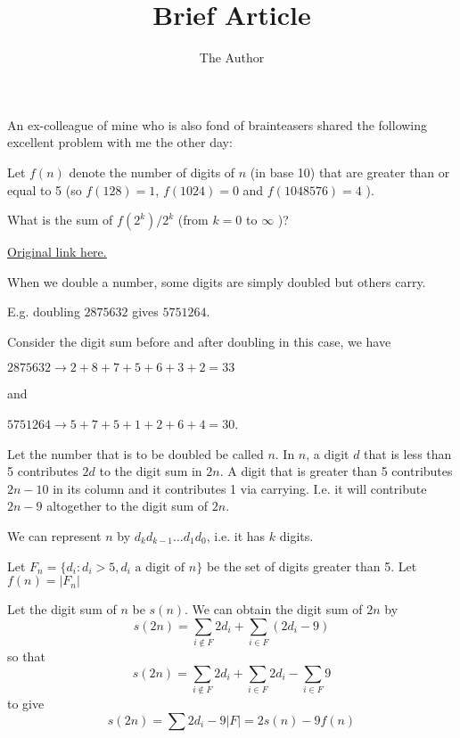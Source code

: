 \documentclass[11pt]{amsart}
\title{Brief Article}
\author{The Author}
\begin{document}
\maketitle



An ex-colleague of mine who is also fond of brainteasers shared the following excellent problem with me the other day:

Let  $f(n)$  denote the number of digits of  $n$  (in base 10) that are greater than or equal to 5 (so  $f(128)=1$, $f(1024)=0$ and  $f(1048576)=4$ ).

What is the sum of  $f(2^{k})/2^{k}$  (from  $k=0$  to $\infty$ )?

\vspace{2em}

\href{http://fine-disregard.blogspot.co.uk/2017/10/digits-in-powers-of-2.html}{Original link here.}

\vspace{2em}


When we double a number, some digits are simply doubled but others carry.

E.g. doubling $2875632$ gives $5751264$. 

Consider the digit sum before and after doubling in this case, we have 

$2875632 \rightarrow 2+8+7+5+6+3+2 = 33$ 

and 

$5751264 \rightarrow 5+7+5+1+2+6+4 = 30$.

Let the number that is to be doubled be called $n$. In $n$, a  digit $d$ that is less than 5 contributes $2d$ to the digit sum in $2n$. A digit that is greater than 5 contributes $2n - 10$ in its column and it contributes 1 via carrying. I.e. it will contribute $2n-9$ altogether to the digit sum of $2n$.

We can represent $n$ by $d_k d_{k-1} \ldots d_{1} d_{0}$, i.e. it has $k$ digits.

Let $F_{n} = \{d_{i} : d_{i} > 5 , d_{i}  \textrm{ a digit of } n\}$ be the set of digits greater than 5. Let  $f(n) = |F_{n}|$

Let the digit sum of $n$ be $s(n)$.  We can obtain the digit sum  of $2n$ by 
%
$$
s(2n) = \sum_{i \notin F} 2 d_{i} + \sum_{i \in F} (2 d_{i} - 9)
$$
so that
$$
s(2n) = \sum_{i \notin F} 2 d_{i} + \sum_{i \in F} 2 d_{i} - \sum_{i \in F} 9
$$
to give
$$
s(2n) = \sum 2 d_{i} - 9 |F|
= 2 s(n) - 9 f(n)
$$
\end{document}
